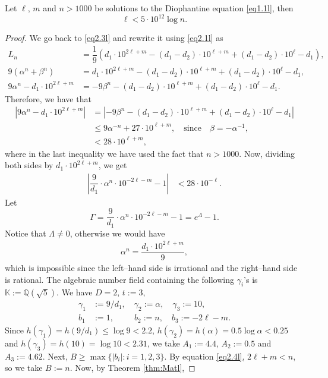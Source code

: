 \begin{lemma}\label{lem3.1l}
	Let $\ell$, $m$ and $n>1000$ be solutions to the Diophantine equation \eqref{eq1.1l}, then
	$$\ell<5\cdot 10^{12}\log n.$$
\end{lemma}
\begin{proof}
We go back to \eqref{eq2.3l} and rewrite it using \eqref{eq2.1l} as	
\begin{align*}
	L_n 
	&=\dfrac{1}{9}\left(d_1\cdot 10^{2\ell+m}-(d_1-d_2)\cdot 10^{\ell+m} +(d_1-d_2)\cdot 10^{\ell}-d_1 \right),\\
	9(\alpha^n+\beta^n) 
	&=d_1\cdot 10^{2\ell+m}-(d_1-d_2)\cdot 10^{\ell+m} +(d_1-d_2)\cdot 10^{\ell}-d_1, \\
	9\alpha^n-d_1\cdot 10^{2\ell+m} &=-9\beta^n-(d_1-d_2)\cdot 10^{\ell+m} +(d_1-d_2)\cdot 10^{\ell}-d_1.
\end{align*}	
Therefore, we have that
\begin{align*}
	\left|9\alpha^n-d_1\cdot 10^{2\ell+m}\right| &=\left|-9\beta^n-(d_1-d_2)\cdot 10^{\ell+m} +(d_1-d_2)\cdot 10^{\ell}-d_1\right|\\
	&\le 9\alpha^{-n}+27\cdot 10^{\ell+m},\quad\text{since}\quad \beta=-\alpha^{-1},\\
	&<28\cdot 10^{\ell+m},
\end{align*}	
where in the last inequality we have used the fact that $n>1000$. Now, dividing both sides by $d_1\cdot 10^{2\ell+m}$, we get	
\begin{align}\label{eq3.1l}
	\left|\dfrac{9}{d_1}\cdot\alpha^n\cdot 10^{-2\ell-m}-1\right|
	&<28\cdot 10^{-\ell}.
\end{align}	
Let 
$$
\Gamma=\dfrac{9}{d_1}\cdot\alpha^n\cdot 10^{-2\ell-m}-1=e^{\Lambda}-1.
$$
Notice that $\Lambda\ne 0$, otherwise we would have
\begin{align*}
	\alpha^n=\dfrac{d_1\cdot 10^{2\ell+m}}{9},
\end{align*}
which is impossible since the left--hand side is irrational and the right--hand side is rational. The algebraic number field containing the following $\gamma_i$'s is $\mathbb{K} := \mathbb{Q}(\sqrt{5})$. We have $D = 2$, $t :=3$,
\begin{equation}\nonumber
	\begin{aligned}
		\gamma_{1}&:=9/d_1,\quad\gamma_{2}:=\alpha,\quad\gamma_{3}:=10,\\
		b_{1}&:=1,\quad \quad~~ b_{2}:=n,\quad b_{3}:=-2\ell-m.
	\end{aligned}
\end{equation}
Since $h(\gamma_{1})=h(9/d_1)\le \log 9 <2.2$, $h(\gamma_{2})=h(\alpha)=0.5\log \alpha <0.25$ and $h(\gamma_{3})=h(10)= \log 10 <2.31$, we take $A_1:=4.4$, $A_2:=0.5$ and $A_3:=4.62$. Next, $B \geq \max\{|b_i|:i=1,2,3\}$. By equation \eqref{eq2.4l}, $2\ell+m<n$, so we take $B:=n$. Now, by Theorem \ref{thm:Matl},

\end{proof}
